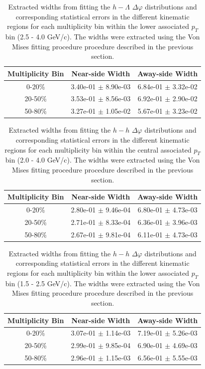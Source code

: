 \documentclass[ALICE,manyauthors]{ALICE_analysis_notes}
\begin{document}
\begin{table}[h!]
\centering
\begin{tabular}{| c || c | c | }
\hline
Multiplicity Bin & Near-side Width & Away-side Width \\
\hline
0-20\% & 3.40e-01 $\pm$ 8.90e-03 &  6.84e-01 $\pm$ 3.32e-02 \\
20-50\% & 3.53e-01 $\pm$ 8.56e-03 &  6.92e-01 $\pm$ 2.90e-02 \\
50-80\% & 3.27e-01 $\pm$ 1.05e-02 &  5.67e-01 $\pm$ 3.23e-02 \\
\hline
\end{tabular}
\caption{Extracted widths from fitting the $h-\Lambda$ $\Delta\varphi$ distributions and corresponding statistical errors in the different kinematic regions for each multiplicity bin within the lower associated $p_{T}$ bin (2.5 - 4.0 GeV/c). The widths were extracted using the Von Mises fitting procedure procedure described in the previous section.}
\label{h_lambda_width_table_highpt}
\end{table}

\begin{table}[h!]
\centering
\begin{tabular}{| c || c | c | }
\hline
Multiplicity Bin & Near-side Width & Away-side Width \\
\hline
0-20\% & 2.80e-01 $\pm$ 9.46e-04 &  6.80e-01 $\pm$ 4.73e-03 \\
20-50\% & 2.71e-01 $\pm$ 8.33e-04 &  6.36e-01 $\pm$ 3.96e-03 \\
50-80\% & 2.67e-01 $\pm$ 9.81e-04 &  6.11e-01 $\pm$ 4.73e-03 \\
\hline
\end{tabular}
\caption{Extracted widths from fitting the $h-h$ $\Delta\varphi$ distributions and corresponding statistical errors in the different kinematic regions for each multiplicity bin within the central associated $p_{T}$ bin (2.0 - 4.0 GeV/c). The widths were extracted using the Von Mises fitting procedure procedure described in the previous section.}
\label{h_h_width_table}
\end{table}

\begin{table}[h!]
\centering
\begin{tabular}{| c || c | c | }
\hline
Multiplicity Bin & Near-side Width & Away-side Width \\
\hline
0-20\% & 3.07e-01 $\pm$ 1.14e-03 &  7.19e-01 $\pm$ 5.26e-03 \\
20-50\% & 2.99e-01 $\pm$ 9.85e-04 &  6.90e-01 $\pm$ 4.69e-03 \\
50-80\% & 2.96e-01 $\pm$ 1.15e-03 &  6.56e-01 $\pm$ 5.55e-03 \\
\hline
\end{tabular}
\caption{Extracted widths from fitting the $h-h$ $\Delta\varphi$ distributions and corresponding statistical errors in the different kinematic regions for each multiplicity bin within the lower associated $p_{T}$ bin (1.5 - 2.5 GeV/c). The widths were extracted using the Von Mises fitting procedure procedure described in the previous section.}
\label{h_h_width_table_lowpt}
\end{table}
\end{document}
